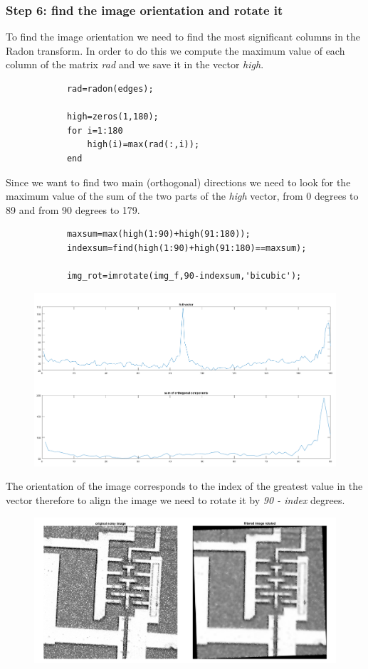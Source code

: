 \documentclass[12pt,a4paper,oneside,final,titlepage,openany,onecolumn]{article}
\begin{document}
		\subsubsection*{Step 6: find the image orientation and rotate it}
		\par
		To find the image orientation we need to find the most significant columns in the Radon transform. In order to do this we compute the maximum value of each column of the matrix \textit{rad} and we save it in the vector \textit{high}.		
		\begin{lstlisting}
			rad=radon(edges);
			
			high=zeros(1,180);
			for i=1:180
				high(i)=max(rad(:,i));
			end
		\end{lstlisting}
		\vspace{0.5\baselineskip}
		Since we want to find two main (orthogonal) directions we need to look for the maximum value of the sum of the two parts of the \textit{high} vector, from 0 degrees to 89 and from 90 degrees to 179.
		\begin{lstlisting}
			maxsum=max(high(1:90)+high(91:180));
			indexsum=find(high(1:90)+high(91:180)==maxsum);
			
			img_rot=imrotate(img_f,90-indexsum,'bicubic');
		\end{lstlisting}
		\begin{figure}[H]
			\includegraphics[width=\linewidth]{images/vector_plot.png}
		\end{figure}
		The orientation of the image corresponds to the index of the greatest value in the vector therefore to align the image we need to rotate it by \textit{90 - index} degrees.
		\begin{figure}[H]
			\includegraphics[width=\linewidth]{images/final_result.png}
		\end{figure}
\end{document}
